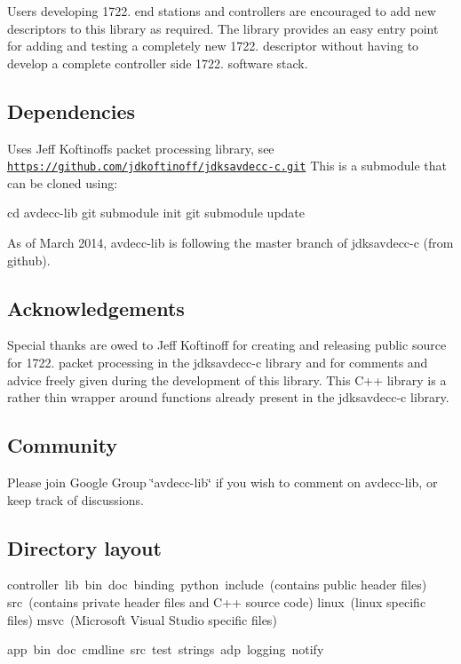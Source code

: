 Users developing 1722. end stations and controllers are encouraged to add new descriptors to this library as required. The library provides an easy entry point for adding and testing a completely new 1722. descriptor without having to develop a complete controller side 1722. software stack.

\subsection*{Dependencies }

Uses Jeff Koftinoff\textquotesingle{}s packet processing library, see \href{https://github.com/jdkoftinoff/jdksavdecc-c.git}{\tt https\+://github.\+com/jdkoftinoff/jdksavdecc-\/c.\+git} This is a submodule that can be cloned using\+: \begin{DoxyVerb}cd avdecc-lib
git submodule init
git submodule update
\end{DoxyVerb}


As of March 2014, avdecc-\/lib is following the master branch of jdksavdecc-\/c (from github).

\subsection*{Acknowledgements }

Special thanks are owed to Jeff Koftinoff for creating and releasing public source for 1722. packet processing in the jdksavdecc-\/c library and for comments and advice freely given during the development of this library. This C++ library is a rather thin wrapper around functions already present in the jdksavdecc-\/c library.

\subsection*{Community }

Please join Google Group \char`\"{}avdecc-\/lib\char`\"{} if you wish to comment on avdecc-\/lib, or keep track of discussions.

\subsection*{Directory layout }

\begin{DoxyVerb}controller\ 
    lib\
        bin\
        doc\
        binding\
            python\
        include\ (contains public header files)
        src\ (contains private header files and C++ source code)
            linux\ (linux specific files)
            msvc\ (Microsoft Visual Studio specific files)

    app\
        bin\
        doc\
        cmdline\
            src\
        test\
            strings\
            adp\
            logging\ 
            notify\     
\end{DoxyVerb}


